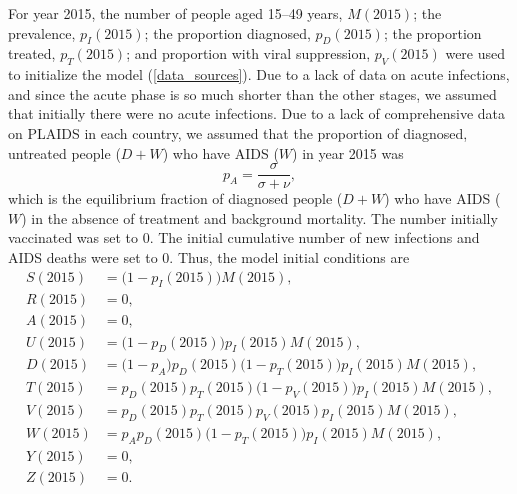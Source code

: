 \documentclass{article}
\begin{document}
For year 2015, the number of people aged 15--49 years, $M(2015)$; the
prevalence, $p_I(2015)$; the proportion diagnosed, $p_D(2015)$; the
proportion treated, $p_T(2015)$; and proportion with viral
suppression, $p_V(2015)$ were used to initialize the model
(\autoref{data_sources}).  Due to a lack of data on acute infections,
and since the acute phase is so much shorter than the other stages, we
assumed that initially there were no acute infections.  Due to a lack
of comprehensive data on PLAIDS in each country, we assumed that the
proportion of diagnosed, untreated people ($D + W$) who have AIDS
($W$) in year 2015 was
\begin{equation}
  p_A = \frac{\sigma}{\sigma + \nu},
\end{equation}
which is the equilibrium fraction of diagnosed people ($D + W$) who
have AIDS ($W$) in the absence of treatment and background mortality.
The number initially vaccinated was set to 0.  The initial cumulative
number of new infections and AIDS deaths were set to 0.  Thus, the
model initial conditions are
\begin{equation}
  \label{initial_conditions}
  \begin{split}
    S(2015) &= \big(1 - p_I(2015)\big) M(2015), \\
    R(2015) &= 0, \\
    A(2015) &= 0, \\
    U(2015) &= \big(1 - p_D(2015)\big) p_I(2015) M(2015), \\
    D(2015) &= \big(1 - p_A\big) p_D(2015) \big(1 - p_T(2015)\big)
    p_I(2015) M(2015), \\
    T(2015) &= p_D(2015) p_T(2015) \big(1 - p_V(2015)\big)
    p_I(2015) M(2015), \\
    V(2015) &= p_D(2015) p_T(2015) p_V(2015) p_I(2015) M(2015), \\
    W(2015) &= p_A p_D(2015) \big(1 - p_T(2015)\big) p_I(2015) M(2015), \\
    Y(2015) &= 0, \\
    Z(2015) &= 0.
  \end{split}
\end{equation}
\end{document}
